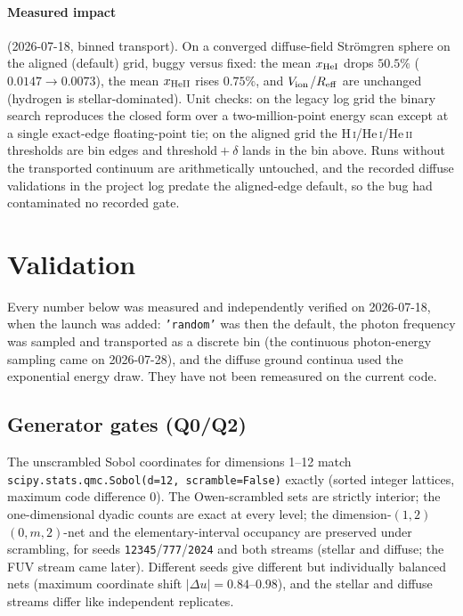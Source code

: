 \documentclass[english,a4paper]{my_memo}
\newcommand{\code}[1]{\texttt{#1}}
\begin{document}
\paragraph{Measured impact} (2026-07-18, binned transport).  On a converged
diffuse-field Str\"omgren sphere on the aligned (default) grid, buggy versus
fixed: the mean $x_{\rm HeI}$ drops
$50.5\%$ ($0.0147 \to 0.0073$), the mean $x_{\rm HeII}$ rises $0.75\%$, and
$V_{\rm ion}$/$R_{\rm eff}$ are unchanged (hydrogen is stellar-dominated).  Unit
checks: on the legacy log grid the binary search reproduces the closed form over
a two-million-point energy scan except at a single exact-edge floating-point
tie; on the aligned grid the H\,\textsc{i}/He\,\textsc{i}/He\,\textsc{ii}
thresholds are bin edges and threshold${}+\delta$ lands in the bin above.  Runs
without the transported continuum are arithmetically untouched, and the recorded
diffuse validations in the project log predate the aligned-edge default, so the
bug had contaminated no recorded gate.

\section{Validation}
\label{sec:val}
Every number below was measured and independently verified on 2026-07-18,
when the launch was added: \code{'random'} was then the default, the photon
frequency was sampled and transported as a discrete bin (the continuous
photon-energy sampling came on 2026-07-28), and the diffuse ground continua used
the exponential energy draw.  They have not been remeasured on the current
code.

\subsection{Generator gates (Q0/Q2)}
The unscrambled Sobol coordinates for dimensions 1--12 match
\code{scipy.stats.qmc.Sobol(d=12, scramble=False)} exactly (sorted integer
lattices, maximum code difference 0).  The Owen-scrambled sets are strictly
interior; the one-dimensional dyadic counts are exact at every level; the
dimension-$(1,2)$ $(0,m,2)$-net and the elementary-interval occupancy are
preserved under scrambling, for seeds \code{12345}/\code{777}/\code{2024} and
both streams (stellar and diffuse; the FUV stream came later).  Different seeds give different but individually balanced nets
(maximum coordinate shift $|\Delta u| = 0.84$--$0.98$), and the stellar and
diffuse streams differ like independent replicates.
\end{document}
